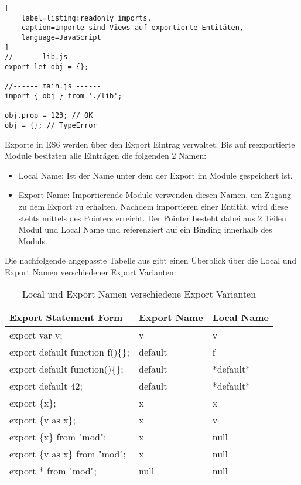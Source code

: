 \begin{lstlisting}[
    label=listing:readonly_imports,
    caption=Importe sind Views auf exportierte Entitäten,
	language=JavaScript
]
//------ lib.js ------
export let obj = {};

//------ main.js ------
import { obj } from './lib';

obj.prop = 123; // OK
obj = {}; // TypeError
\end{lstlisting}

Exporte in ES6 werden über den Export Eintrag verwaltet. Bis auf reexportierte Module besitzten alle Einträgen die folgenden 2 Namen: 

\begin{itemize}
\item Local Name: Ist der Name unter dem der Export im Module gespeichert ist.
\item Export Name: Importierende Module verwenden diesen Namen, um Zugang zu dem Export zu erhalten. Nachdem importieren einer Entität, wird diese stehts mittels des Pointers erreicht. Der Pointer besteht dabei aus 2 Teilen Modul und Local Name und referenziert auf ein Binding innerhalb des Moduls.
\end{itemize}
\autocite{AxelRauschmayer2018}

Die nachfolgende angepasste Tabelle aus \textcite{ECMAScript} gibt einen Überblick über die Local und Export Namen verschiedener Export Varianten:

\begin{table}[H]
\centering
\caption{Local und Export Namen verschiedene Export Varianten}
\label{local_export_names}
\begin{tabular}{|l|l|l|}
\hline
Export Statement Form            & Export Name & Local Name \\ \hline
export var v;                    & v           & v          \\ \hline
export default function f()\{\}; & default     & f          \\ \hline
export default function()\{\};   & default     & *default*  \\ \hline
export default 42;               & default     & *default*  \\ \hline
export \{x\};                    & x           & x          \\ \hline
export \{v as x\};               & x           & v          \\ \hline
export \{x\} from "mod";         & x           & null       \\ \hline
export \{v as x\} from "mod";    & x           & null       \\ \hline
export * from "mod";             & null        & null       \\ \hline
\end{tabular}
\end{table}

